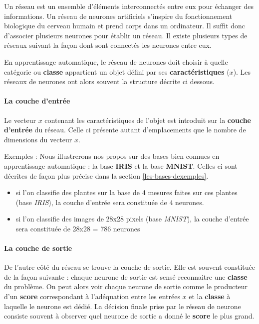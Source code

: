 Un réseau est un ensemble d'éléments interconnectés entre eux pour
échanger des informations. Un réseau de neurones artificiels s'inspire
du fonctionnement biologique du cerveau humain et prend corps dans un
ordinateur. Il suffit donc d'associer plusieurs neurones pour établir un
réseau. Il existe plusieurs types de réseaux suivant la façon dont sont
connectés les neurones entre eux.

En apprentissage automatique, le réseau de neurones doit choisir à
quelle catégorie ou \textbf{classe} appartient un objet défini par ses
\textbf{caractéristiques} (\(x\)). Les réseaux de neurones ont alors
souvent la structure décrite ci dessous.

\hypertarget{la-couche-dentruxe9e}{%
\paragraph{La couche d'entrée}\label{la-couche-dentruxe9e}}

Le vecteur \(x\) contenant les caractéristiques de l'objet est introduit
sur la \textbf{couche d'entrée} du réseau. Celle ci présente autant
d'emplacements que le nombre de dimensions du vecteur \(x\).

Exemples : Nous illustrerons nos propos sur des bases bien connues en
apprentissage automatique : la base \textbf{IRIS} et la base
\textbf{MNIST}. Celles ci sont décrites de façon plus précise dans la
section \ref{les-bases-dexemples}.

\begin{itemize}
\tightlist
\item
  si l'on classifie des plantes sur la base de 4 mesures faites sur ces
  plantes (base \emph{IRIS}), la couche d'entrée sera constituée de 4
  neurones.
\item
  si l'on classifie des images de 28x28 pixels (base \emph{MNIST}), la
  couche d'entrée sera constituée de 28x28 = 786 neurones
\end{itemize}

\hypertarget{la-couche-de-sortie}{%
\paragraph{La couche de sortie}\label{la-couche-de-sortie}}

De l'autre côté du réseau se trouve la couche de sortie. Elle est
souvent constituée de la façon suivante : chaque neurone de sortie est
sensé reconnaitre une \textbf{classe} du problème. On peut alors voir
chaque neurone de sortie comme le producteur d'un \textbf{score}
correspondant à l'adéquation entre les entrées \(x\) et la
\textbf{classe} à laquelle le neurone est dédié. La décision finale
prise par le réseau de neurone consiste souvent à observer quel neurone
de sortie a donné le \textbf{score} le plus grand.

